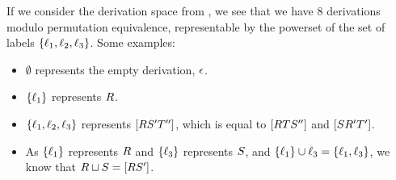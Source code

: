 \begin{example}
If we consider the derivation space from ,
we see that we have 8 derivations modulo permutation equivalence,
representable by the powerset of the set of labels $\{\ell_1, \ell_2, \ell_3\}$.
Some examples:
\begin{itemize}
  \item $\emptyset$ represents the empty derivation, $\epsilon$.
  \item $\{\ell_1\}$ represents $R$.
  \item $\{\ell_1, \ell_2, \ell_3\}$ represents $[R S' T'']$,
    which is equal to $[R T S'']$ and $[S R' T']$.
  \item As $\{\ell_1\}$ represents $R$ and $\{\ell_3\}$ represents $S$, and $\{\ell_1\} \cup {\ell_3} = \{\ell_1, \ell_3\}$, we know that $R \sqcup S = [R S']$.
\end{itemize}
\end{example}


